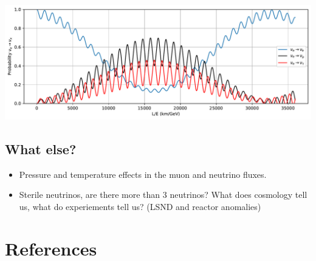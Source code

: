 \documentclass[
  letterpaper,
  DIV=11,
  numbers=noendperiod]{scrreprt}
\newlength{\cslhangindent}
\newenvironment{CSLReferences}[2] %
 {\begin{list}{}{%
  \setlength{\itemindent}{0pt}
  \setlength{\leftmargin}{0pt}
  \setlength{\parsep}{0pt}
  \ifodd #1
   \setlength{\leftmargin}{\cslhangindent}
   \setlength{\itemindent}{-1\cslhangindent}
  \fi
  \setlength{\itemsep}{#2\baselineskip}}}
 {\end{list}}
\begin{document}
\includegraphics{chap3_files/figure-pdf/cell-8-output-1.pdf}

\section*{What else?}\label{what-else-1}


\begin{itemize}
\item
  Pressure and temperature effects in the muon and neutrino fluxes.
\item
  Sterile neutrinos, are there more than 3 neutrinos? What does
  cosmology tell us, what do experiements tell us? (LSND and reactor
  anomalies)
\end{itemize}


\chapter*{References}\label{references-2}


\label{refs}
\begin{CSLReferences}{0}{1}
\end{CSLReferences}
\end{document}
